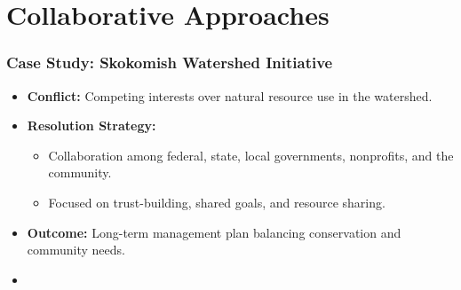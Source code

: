 \documentclass[10pt]{beamer}
\begin{document}
        \section{Collaborative Approaches}
        
        \begin{frame}
        \frametitle{Case Study: Skokomish Watershed Initiative}
        \begin{itemize}
            \item \textbf{Conflict:} Competing interests over natural resource use in the watershed.
            \item \textbf{Resolution Strategy:}
                \begin{itemize}
                    \item Collaboration among federal, state, local governments, nonprofits, and the community.
                    \item Focused on trust-building, shared goals, and resource sharing.
                \end{itemize}
            \item \textbf{Outcome:} Long-term management plan balancing conservation and community needs.
            \item {}
        \end{itemize}
        \end{frame}
        
\end{document}
